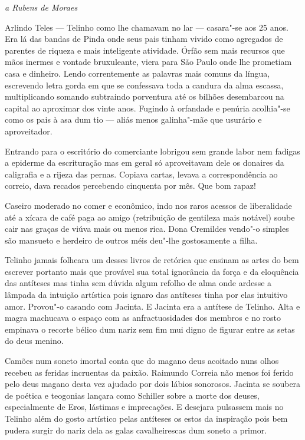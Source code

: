 \hfill{}\emph{a Rubens de Moraes}\bigskip

\begin{linenumbers}
\noindent{}Arlindo Teles --- Telinho como lhe chamavam no lar --- casara"-se aos 25
anos. Era lá das bandas de Pinda onde seus pais tinham vivido como
agregados de parentes de riqueza e mais inteligente atividade. Órfão sem
mais recursos que mãos inermes e vontade bruxuleante, viera para São
Paulo onde lhe prometiam casa e dinheiro. Lendo correntemente as
palavras mais comuns da língua, escrevendo letra gorda em que se
confessava toda a candura da alma escassa, multiplicando somando
subtraindo porventura até os bilhões desembarcou na capital ao aproximar
dos vinte anos. Fugindo à orfandade e penúria acolhia"-se como os pais à
asa dum tio --- aliás menos galinha"-mãe que usurário e aproveitador.

Entrando para o escritório do comerciante lobrigou sem grande labor nem
fadigas a epiderme da escrituração mas em geral só aproveitavam dele os
donaires da caligrafia e a rijeza das pernas. Copiava cartas, levava a
correspondência ao correio, dava recados percebendo cinquenta por mês.
Que bom rapaz!

Caseiro moderado no comer e econômico, indo nos raros acessos de
liberalidade até a xícara de café paga ao amigo (retribuição de
gentileza mais notável) soube cair nas graças de viúva mais ou menos
rica. Dona Cremildes vendo"-o simples são mansueto e herdeiro de outros
méis deu"-lhe gostosamente a filha.

Telinho jamais folheara um desses livros de retórica que ensinam as
artes do bem escrever portanto mais que provável sua total ignorância da
força e da eloquência das antíteses mas tinha sem dúvida algum refolho
de alma onde ardesse a lâmpada da intuição artística pois ignaro das
antíteses tinha por elas intuitivo amor. Provou"-o casando com Jacinta. E
Jacinta era a antítese de Telinho. Alta e magra machucava o espaço com
as anfractuosidades dos membros e no rosto empinava o recorte bélico dum
nariz sem fim mui digno de figurar entre as setas do deus menino.

Camões num soneto imortal conta que do magano deus acoitado nuns olhos
recebeu as feridas incruentas da paixão. Raimundo Correia não menos foi
ferido pelo deus magano desta vez ajudado por dois lábios sonorosos.
Jacinta se soubera de poética e teogonias lançara como Schiller sobre a
morte dos deuses, especialmente de Eros, lástimas e imprecações. E
desejara pulsassem mais no Telinho além do gosto artístico pelas
antíteses os estos da inspiração pois bem pudera surgir do nariz dela as
galas cavalheirescas dum soneto a primor.


\end{linenumbers}
